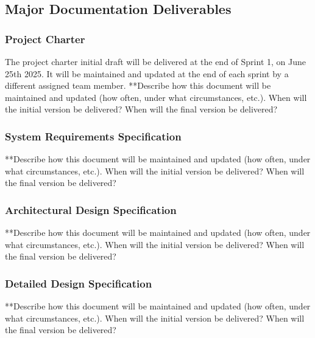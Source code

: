 
\subsection{Major Documentation Deliverables}

\subsubsection{Project Charter}
The project charter initial draft will be delivered at the end of Sprint 1, on June 25th 2025. It will be maintained and updated at the end of each sprint by a different assigned team member.
**Describe how this document will be maintained and updated (how often, under what circumstances, etc.). When will the initial version be delivered? When will the final version be delivered?

\subsubsection{System Requirements Specification}
**Describe how this document will be maintained and updated (how often, under what circumstances, etc.). When will the initial version be delivered? When will the final version be delivered?

\subsubsection{Architectural Design Specification}
**Describe how this document will be maintained and updated (how often, under what circumstances, etc.). When will the initial version be delivered? When will the final version be delivered?

\subsubsection{Detailed Design Specification}
**Describe how this document will be maintained and updated (how often, under what circumstances, etc.). When will the initial version be delivered? When will the final version be delivered?


